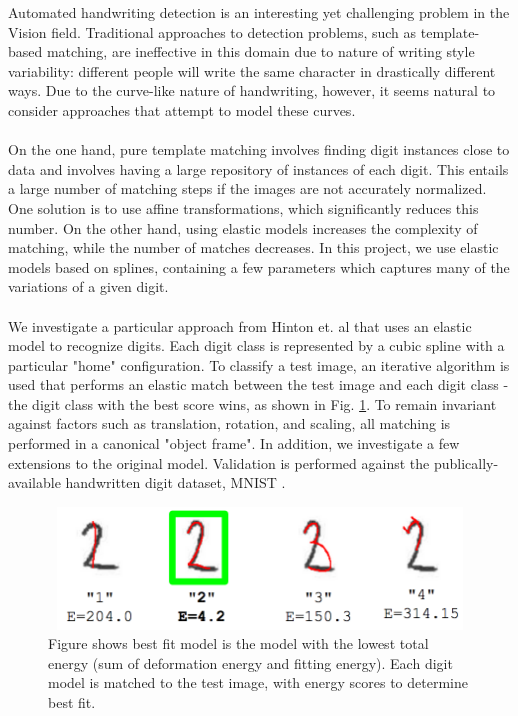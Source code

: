\documentclass[oribibl]{llncs}
\begin{document}
Automated handwriting detection is an interesting yet challenging problem in the Vision field. Traditional approaches to detection problems, such as template-based matching, are ineffective in this domain due to nature of writing style variability: different people will write the same character in drastically different ways. Due to the curve-like nature of handwriting, however, it seems natural to consider approaches that attempt to model these curves.  
\\
\\
On the one hand, pure template matching involves finding digit instances close to data and involves having a large repository of instances of each digit. This entails a large number of matching steps if the images are not accurately normalized. One solution is to use affine transformations, which significantly reduces this number. On the other hand, using elastic models increases the complexity of matching, while the number of matches decreases. In this project, we use elastic models based on splines, containing a few parameters which captures many of the variations of a given digit. 
\\
\\
We investigate a particular approach from Hinton et. al \cite{Hinton92adaptiveelastic} that uses an elastic model to recognize digits. Each digit class is represented by a cubic spline with a particular "home" configuration. To classify a test image, an iterative algorithm is used that performs an elastic match between the test image and each digit class - the digit class with the best score wins, as shown in Fig. \ref{fig:bestFitEg}. To remain invariant against factors such as translation, rotation, and scaling, all matching is performed in a canonical "object frame". In addition, we investigate a few extensions to the original model. Validation is performed against the publically-available handwritten digit dataset, MNIST \cite{mnist}.

\begin{figure}
\centering
\includegraphics[height=3.25cm , width=12cm ]{bestFitEg}
\caption[]{Figure shows best fit model is the model with the lowest total energy (sum of deformation energy and fitting energy). Each digit model is matched to the test image, with energy scores to determine best fit.} 
\label{fig:bestFitEg}
\end{figure}
\end{document}
